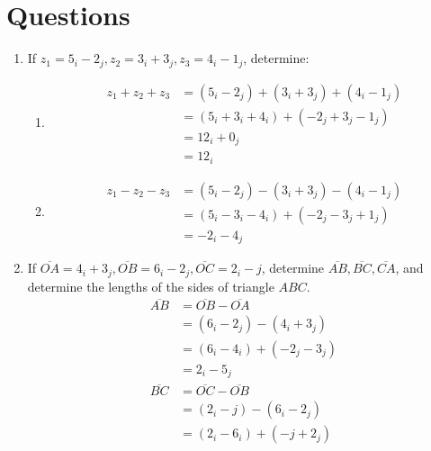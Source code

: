 \documentclass[12pt,titlepage]{article}
\begin{document}
\section{Questions}
\begin{enumerate}
    \item {
        If $z_1 = 5_i - 2_j, z_2 = 3_i + 3_j, z_3 = 4_i - 1_j$, determine:
        \begin{enumerate}
            \item {
                \begin{align*}
                    z_1 + z_2 + z_3 &= (5_i - 2_j) + (3_i + 3_j) + (4_i - 1_j) \\
                                    &= (5_i + 3_i + 4_i) + (-2_j + 3_j - 1_j) \\
                                    &= 12_i + 0_j \\
                                    &= 12_i
                \end{align*}
            }
            \item {
                \begin{align*}
                    z_1 - z_2 - z_3 &= (5_i - 2_j) - (3_i + 3_j) - (4_i - 1_j) \\
                                    &= (5_i - 3_i - 4_i) + (-2_j - 3_j + 1_j) \\
                                    &= -2_i - 4_j
                \end{align*}
            }
        \end{enumerate}
    }
    \item {
        If $\overline{OA} = 4_i + 3_j, \overline{OB} = 6_i - 2_j, \overline{OC} = 2_i - j$, determine
        $\overline{AB}, \overline{BC}, \overline{CA}$, and determine the lengths of the sides of triangle $ABC$.
        \begin{align*}
            \overline{AB} &= \overline{OB} - \overline{OA} \\
                            &= (6_i - 2_j) - (4_i + 3_j) \\
                            &= (6_i - 4_i) + (-2_j - 3_j) \\
                            &= 2_i - 5_j\\
            \overline{BC} &= \overline{OC} - \overline{OB} \\
                            &= (2_i - j) - (6_i - 2_j) \\
                            &= (2_i - 6_i) + (-j + 2_j) \\

\end{align*}}
\end{enumerate}
\end{document}
